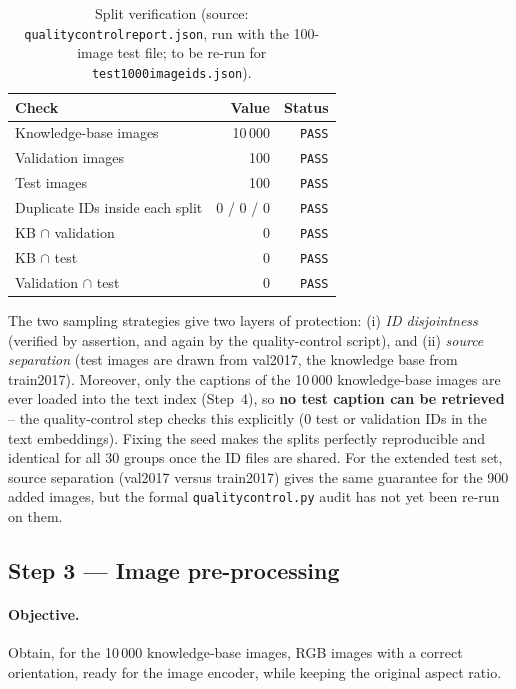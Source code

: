 \documentclass[11pt,a4paper]{article}
\renewcommand{\_}{\textunderscore\allowbreak{}}
\newcommand{\code}[1]{\texttt{#1}}
\begin{document}
\begin{table}[H]
\centering
\begin{tabular}{@{}lrr@{}}
\toprule
\textbf{Check} & \textbf{Value} & \textbf{Status}\\
\midrule
Knowledge-base images & 10\,000 & \texttt{PASS}\\
Validation images & 100 & \texttt{PASS}\\
Test images & 100 & \texttt{PASS}\\
Duplicate IDs inside each split & 0 / 0 / 0 & \texttt{PASS}\\
KB $\cap$ validation & 0 & \texttt{PASS}\\
KB $\cap$ test & 0 & \texttt{PASS}\\
Validation $\cap$ test & 0 & \texttt{PASS}\\
\bottomrule
\end{tabular}
\caption{Split verification (source: \code{quality\_control\_report.json}, run with the 100-image test file; to be re-run for \code{test\_1000\_image\_ids.json}).}
\end{table}

\begin{interp}
The two sampling strategies give two layers of protection: (i) \emph{ID disjointness} (verified by assertion, and again by the quality-control script), and (ii) \emph{source separation} (test images are drawn from val2017, the knowledge base from train2017). Moreover, only the captions of the 10\,000 knowledge-base images are ever loaded into the text index (Step~4), so \textbf{no test caption can be retrieved} -- the quality-control step checks this explicitly ($0$ test or validation IDs in the text embeddings). Fixing the seed makes the splits perfectly reproducible and identical for all 30 groups once the ID files are shared. For the extended test set, source separation (val2017 versus train2017) gives the same guarantee for the 900 added images, but the formal \code{quality\_control.py} audit has not yet been re-run on them.
\end{interp}


\subsection{Step 3 --- Image pre-processing}
\label{sec:images}

\paragraph{Objective.} Obtain, for the 10\,000 knowledge-base images, RGB images with a correct orientation, ready for the image encoder, while keeping the original aspect ratio.
\end{document}
